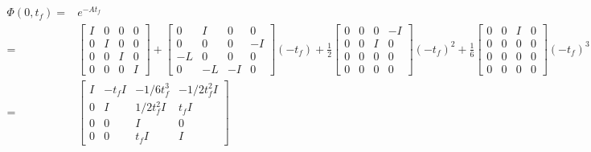 \documentclass[letterpaper, 10 pt, conference,onecolumn]{ieeeconf}  %
\begin{document}
\begin{align*}
\Phi(0,t_f)=&e^{-At_f}\\
=&\begin{bmatrix}
I&0&0&0\\
0&I&0&0\\
0&0&I&0\\
0&0&0&I
\end{bmatrix}+\begin{bmatrix}
0&I&0&0\\
0&0&0&-I\\
-L&0&0&0\\
0&-L&-I&0
\end{bmatrix}(-t_f)+\frac{1}{2}\begin{bmatrix}
0&0&0&-I\\
0&0&I&0\\
0&0&0&0\\
0&0&0&0
\end{bmatrix}(-t_f)^2+\frac{1}{6}\begin{bmatrix}
0&0&I&0\\
0&0&0&0\\
0&0&0&0\\
0&0&0&0
\end{bmatrix}(-t_f)^3\\
=&\begin{bmatrix}
I&-t_f I&-1/6t_f^3&-1/2t_f^2I\\
0&I&1/2t_f^2I&t_f I\\
0&0&I&0\\
0&0&t_f I&I
\end{bmatrix}
\end{align*}
\end{document}
